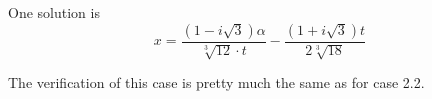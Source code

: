 One solution is
\[x = \frac{(1-i \sqrt{3}) \alpha}{\sqrt[3]{12} \cdot t}
     -\frac{(1+i\sqrt{3}) t}{2\sqrt[3]{18}}\]

The verification of this case is pretty much the same as for
case 2.2.
